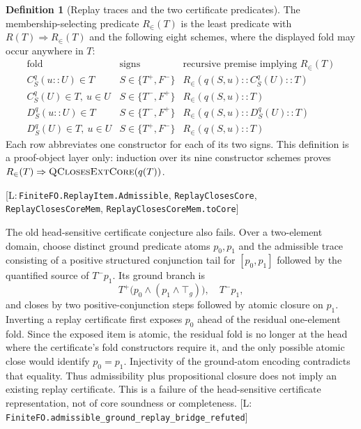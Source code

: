 \documentclass[11pt,a4paper]{article}
\theoremstyle{definition}
\newtheorem{definition}[theorem]{Definition}
\newcommand{\Tp}{T^{+}}\newcommand{\Tm}{T^{-}}
\newcommand{\Fp}{F^{+}}\newcommand{\Fm}{F^{-}}
\newcommand{\lean}[1]{\texttt{#1}}
\newenvironment{leanrefs}
  {\par\smallskip\noindent\begin{minipage}{\linewidth}\small\raggedright}
  {\end{minipage}\par\smallskip}
\begin{document}
\begin{definition}[Replay traces and the two certificate predicates]
The membership-selecting predicate $R_{\in}(T)$ is the least predicate with
$R(T)\Rightarrow R_{\in}(T)$ and the following eight schemes, where the
displayed fold may occur anywhere in $T$:
\[
\begin{array}{c|c|c}
\text{fold} & \text{signs} & \text{recursive premise implying }R_{\in}(T)\\ \hline
C^q_S(u::U)\in T & S\in\{\Tp,\Fm\} &
 R_{\in}(q(S,u)::C^q_S(U)::T)\\
C^q_S(U)\in T,\ u\in U & S\in\{\Tm,\Fp\} &
 R_{\in}(q(S,u)::T)\\
D^q_S(u::U)\in T & S\in\{\Tm,\Fp\} &
 R_{\in}(q(S,u)::D^q_S(U)::T)\\
D^q_S(U)\in T,\ u\in U & S\in\{\Tp,\Fm\} &
 R_{\in}(q(S,u)::T)
\end{array}
\]
Each row abbreviates one constructor for each of its two signs. This definition
is a proof-object layer only: induction over its nine constructor schemes proves
$R_{\in}(T)\Rightarrow\textsc{QClosesExtCore}(q(T))$.
\begin{leanrefs}
[L:\,\lean{FiniteFO.ReplayItem.Admissible},
\lean{ReplayClosesCore}, \lean{ReplayClosesCoreMem},\newline
\lean{ReplayClosesCoreMem.toCore}]
\end{leanrefs}
\end{definition}

The old head-sensitive certificate conjecture also fails.  Over a two-element
domain, choose distinct ground predicate atoms $p_0,p_1$ and the admissible
trace consisting of a positive structured conjunction tail for
$[p_0,p_1]$ followed by the quantified source of $\Tm p_1$.  Its ground
branch is
\[
  \Tp\bigl(p_0\land(p_1\land\top_g)\bigr),\quad \Tm p_1,
\]
and closes by two positive-conjunction steps followed by atomic closure on
$p_1$.  Inverting a replay certificate first exposes $p_0$ ahead of the
residual one-element fold.  Since the exposed item is atomic, the residual
fold is no longer at the head where the certificate's fold constructors
require it, and the only possible atomic close would identify
$p_0=p_1$.  Injectivity of the ground-atom encoding contradicts that
equality.  Thus admissibility plus propositional closure does not imply an
existing replay certificate.  This is a failure of the head-sensitive
certificate representation, not of core soundness or completeness.
[L:\,\lean{FiniteFO.admissible\_ground\_replay\_bridge\_refuted}]
\end{document}
